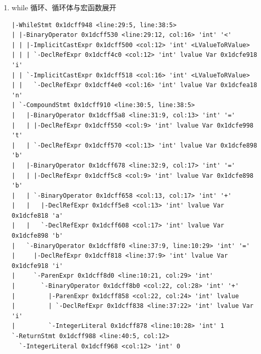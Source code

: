 \documentclass[UTF8,a4paper,10pt]{ctexart}
\begin{document}
\begin{enumerate}[label=\roman*.]
\verb|BinaryOperator| 表示二元运算。在 \verb|a = 0| 的节点中，赋值号左侧的
\verb|DeclRefExpr| 表示对变量 \verb|a| 的引用，右侧的
\verb|IntegerLiteral| 表示整数常量 \verb|0|。需要注意的是，该常量的位置来自
\verb|main.c| 第 7 行的宏定义，说明 \verb|FIB_A0| 已经在预处理阶段被替换为
\verb|0|，语法分析直接处理的是宏展开后的结果。

\verb|CallExpr| 表示函数调用。\verb|scanf| 调用中包含字符串字面量
\verb|"%d"|、取地址运算符 \verb|&| 以及变量 \verb|n| 的引用，分别对应源程序
中的格式字符串和 \verb|&n|。同样，两个 \verb|printf| 调用中包含字符串字面量
\verb|"%d\n"|，并通过 \verb|DeclRefExpr| 引用变量 \verb|a| 或 \verb|b|，从
而确定了输出语句的语法结构。

\verb|ImplicitCastExpr| 并没有直接写在源程序中，而是编译器根据类型规则自动
加入的隐式转换节点。例如，函数名需要转换为函数指针，数组形式的字符串需要转换
为字符指针，变量从存储位置读取数值时则会产生 \verb|LValueToRValue| 转换。

    \item while 循环、循环体与宏函数展开

\begin{lstlisting}[style=asm]
|-WhileStmt 0x1dcff948 <line:29:5, line:38:5>
| |-BinaryOperator 0x1dcff530 <line:29:12, col:16> 'int' '<'
| | |-ImplicitCastExpr 0x1dcff500 <col:12> 'int' <LValueToRValue>
| | | `-DeclRefExpr 0x1dcff4c0 <col:12> 'int' lvalue Var 0x1dcfe918 'i'
| | `-ImplicitCastExpr 0x1dcff518 <col:16> 'int' <LValueToRValue>
| |   `-DeclRefExpr 0x1dcff4e0 <col:16> 'int' lvalue Var 0x1dcfea18 'n'
| `-CompoundStmt 0x1dcff910 <line:30:5, line:38:5>
|   |-BinaryOperator 0x1dcff5a8 <line:31:9, col:13> 'int' '='
|   | |-DeclRefExpr 0x1dcff550 <col:9> 'int' lvalue Var 0x1dcfe998 't'
|   | `-DeclRefExpr 0x1dcff570 <col:13> 'int' lvalue Var 0x1dcfe898 'b'
|   |-BinaryOperator 0x1dcff678 <line:32:9, col:17> 'int' '='
|   | |-DeclRefExpr 0x1dcff5c8 <col:9> 'int' lvalue Var 0x1dcfe898 'b'
|   | `-BinaryOperator 0x1dcff658 <col:13, col:17> 'int' '+'
|   |   |-DeclRefExpr 0x1dcff5e8 <col:13> 'int' lvalue Var 0x1dcfe818 'a'
|   |   `-DeclRefExpr 0x1dcff608 <col:17> 'int' lvalue Var 0x1dcfe898 'b'
|   `-BinaryOperator 0x1dcff8f0 <line:37:9, line:10:29> 'int' '='
|     |-DeclRefExpr 0x1dcff818 <line:37:9> 'int' lvalue Var 0x1dcfe918 'i'
|     `-ParenExpr 0x1dcff8d0 <line:10:21, col:29> 'int'
|       `-BinaryOperator 0x1dcff8b0 <col:22, col:28> 'int' '+'
|         |-ParenExpr 0x1dcff858 <col:22, col:24> 'int' lvalue
|         | `-DeclRefExpr 0x1dcff838 <line:37:22> 'int' lvalue Var 'i'
|         `-IntegerLiteral 0x1dcff878 <line:10:28> 'int' 1
`-ReturnStmt 0x1dcff988 <line:40:5, col:12>
  `-IntegerLiteral 0x1dcff968 <col:12> 'int' 0
\end{lstlisting}


\end{enumerate}
\end{document}

